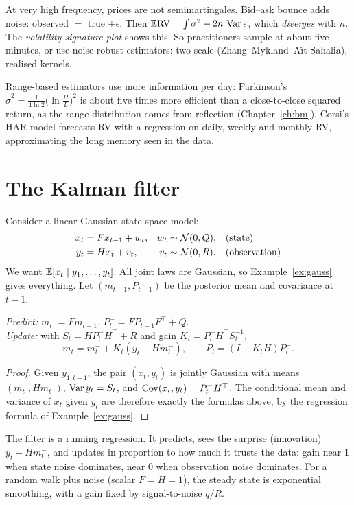 \begin{pitfall}
At very high frequency, prices are not semimartingales. Bid--ask bounce adds noise: observed $=$ true $+\epsilon$. Then $\mathbb{E}\mathrm{RV}=\int\sigma^2+2n\,\operatorname{Var}\epsilon$, which \emph{diverges} with $n$. The \emph{volatility signature plot} shows this. So practitioners sample at about five minutes, or use noise-robust estimators: two-scale (Zhang--Mykland--A\"it-Sahalia), realised kernels.
\end{pitfall}

Range-based estimators use more information per day: Parkinson's $\hat\sigma^2=\frac{1}{4\ln2}\bigl(\ln\frac HL\bigr)^2$ is about five times more efficient than a close-to-close squared return, as the range distribution comes from reflection (Chapter~\ref{ch:bm}). Corsi's HAR model forecasts RV with a regression on daily, weekly and monthly RV, approximating the long memory seen in the data.

\section{The Kalman filter}\label{sec:kalman}

Consider a linear Gaussian state-space model:
\begin{align*}
x_t&=Fx_{t-1}+w_t,&w_t&\sim\mathcal{N}(0,Q),&&\text{(state)}\\
y_t&=Hx_t+v_t,&v_t&\sim\mathcal{N}(0,R).&&\text{(observation)}
\end{align*}
We want $\mathbb{E}[x_t\mid y_1,\dots,y_t]$. All joint laws are Gaussian, so Example~\ref{ex:gauss} gives everything. Let $(m_{t-1},P_{t-1})$ be the posterior mean and covariance at $t-1$.

\begin{theorem}[Kalman]
\emph{Predict:} $m_t^-=Fm_{t-1}$, $P_t^-=FP_{t-1}F^\top+Q$.\\
\emph{Update:} with $S_t=HP_t^-H^\top+R$ and gain $K_t=P_t^-H^\top S_t^{-1}$,
\[
m_t=m_t^-+K_t(y_t-Hm_t^-),\qquad P_t=(I-K_tH)P_t^-.
\]
\end{theorem}
\begin{proof}
Given $y_{1:t-1}$, the pair $(x_t,y_t)$ is jointly Gaussian with means $(m_t^-,Hm_t^-)$, $\operatorname{Var} y_t=S_t$, and $\operatorname{Cov}(x_t,y_t)=P_t^-H^\top$. The conditional mean and variance of $x_t$ given $y_t$ are therefore exactly the formulas above, by the regression formula of Example~\ref{ex:gauss}.
\end{proof}

\begin{intuition}
The filter is a running regression. It predicts, sees the surprise (innovation) $y_t-Hm_t^-$, and updates in proportion to how much it trusts the data: gain near $1$ when state noise dominates, near $0$ when observation noise dominates. For a random walk plus noise (scalar $F=H=1$), the steady state is exponential smoothing, with a gain fixed by signal-to-noise $q/R$.
\end{intuition}

